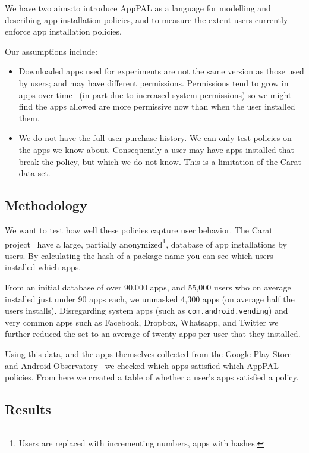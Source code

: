 \documentclass[twocolumn,letterpaper]{soups-poster}
\newcommand{\citep}[1]{\cite{#1}}
\begin{document}
We have two aims:to introduce AppPAL as a language for modelling and describing
app installation policies, and to measure the extent users currently enforce app
installation policies.

Our assumptions include:
\begin{itemize}
  \item Downloaded apps used for experiments are not the same version as those
    used by users; and may have different permissions. Permissions tend to grow
    in apps over time~\citep{Wei:2012id} (in part due to increased system
    permissions) so we might find the apps allowed are more permissive now than
    when the user installed them.

  \item We do not have the full user purchase history.
    We can only test policies on the apps we know about.
    Consequently a user may have apps installed that break the policy, but which
    we do not know.  This is a limitation of the Carat data set.
\end{itemize}

\subsection{Methodology}

We want to test how well these policies capture user behavior.
The Carat project~\citep{Oliner:2013ht} have a large, partially
anonymized\footnote{Users are replaced with incrementing numbers, apps with
hashes.},
database of app installations by users.  By calculating the hash of a package
name you can see which users installed which apps.

From an initial database of over 90,000 apps, and 55,000 users who on average
installed just under 90 apps each, we unmasked 4,300 apps (on average half the
  users installs).  Disregarding system apps (such as
\texttt{com.android.vending}) and very common apps such as Facebook, Dropbox,
Whatsapp, and Twitter we further reduced the set to an average of twenty apps
per user that they installed.

Using this data, and the apps themselves collected from the Google Play Store
and Android Observatory~\citep{Barrera:2012iba} we checked which apps satisfied
which AppPAL policies.  From here we created a table of whether a user's apps
satisfied a policy.

\subsection{Results}
\end{document}
